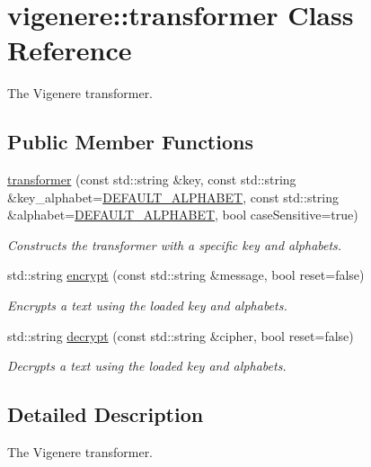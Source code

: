 \hypertarget{classvigenere_1_1transformer}{}\section{vigenere\+:\+:transformer Class Reference}
\label{classvigenere_1_1transformer}


The Vigenere transformer.  


\subsection*{Public Member Functions}
\begin{DoxyCompactItemize}
\item 
\hyperlink{classvigenere_1_1transformer_a6931ac81a4a3b928772f3f1a23f75e4f}{transformer} (const std\+::string \&key, const std\+::string \&key\+\_\+alphabet=\hyperlink{namespacevigenere_a7bb30f050b9b52887eb2463b36c4e7b6}{D\+E\+F\+A\+U\+L\+T\+\_\+\+A\+L\+P\+H\+A\+B\+ET}, const std\+::string \&alphabet=\hyperlink{namespacevigenere_a7bb30f050b9b52887eb2463b36c4e7b6}{D\+E\+F\+A\+U\+L\+T\+\_\+\+A\+L\+P\+H\+A\+B\+ET}, bool case\+Sensitive=true)
\begin{DoxyCompactList}\small\item\em Constructs the transformer with a specific key and alphabets. \end{DoxyCompactList}\item 
std\+::string \hyperlink{classvigenere_1_1transformer_a91a52805f6ccaab40347d745612f7916}{encrypt} (const std\+::string \&message, bool reset=false)
\begin{DoxyCompactList}\small\item\em Encrypts a text using the loaded key and alphabets. \end{DoxyCompactList}\item 
std\+::string \hyperlink{classvigenere_1_1transformer_afa07a1798c0036811a1f07a034f6ecfe}{decrypt} (const std\+::string \&cipher, bool reset=false)
\begin{DoxyCompactList}\small\item\em Decrypts a text using the loaded key and alphabets. \end{DoxyCompactList}\end{DoxyCompactItemize}


\subsection{Detailed Description}
The Vigenere transformer. 

